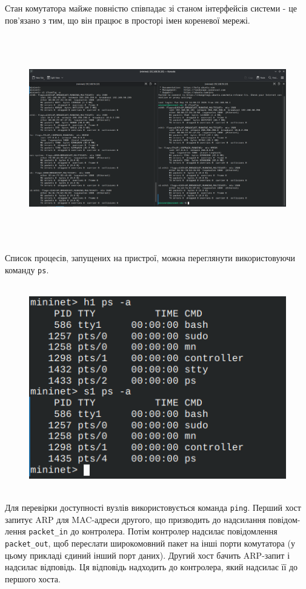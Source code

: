 \documentclass[14pt, a4paper]{extreport}
\begin{document}
	Стан комутатора майже повністю співпадає зі станом інтерфейсів системи - це пов'язано з тим, що він працює в просторі імен кореневої мережі.
	
	\begin{figure}[H]
		\centering
		\includegraphics[height=9cm]{10} 
	\end{figure}
	
	Список процесів, запущених на пристрої, можна переглянути використовуючи команду \texttt{ps}.
	
	\begin{figure}[H]
		\centering
		\includegraphics[height=9cm]{11} 
	\end{figure}
	
	Для перевірки доступності вузлів використовується команда \texttt{ping}.
	Перший хост запитує ARP для MAC-адреси другого, що призводить до надсилання повідом\hyp{}лення \texttt{packet\_in} до контролера. Потім контролер надсилає повідомлення \texttt{packet\_out}, щоб переслати широкомовний пакет на інші порти комутатора (у цьому прикладі єдиний інший порт даних). Другий хост бачить ARP-запит і надсилає відповідь. Ця відповідь надходить до контролера, який надсилає її до першого хоста.
	
\end{document}
